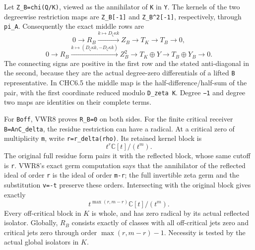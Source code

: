Let \texttt{Z\_B=chi(Q/K)\textquotesingle{}}, viewed as the annihilator
of \texttt{K} in \texttt{Y}. The kernels of the two degreewise
restriction maps are \texttt{Z\_B{[}-1{]}} and
\texttt{Z\_B\^{}2{[}-1{]}}, respectively, through
\texttt{pi\_A\textquotesingle{}}. Consequently the exact middle rows are
\[
0\to R_B\xrightarrow{k\mapsto D_\zeta\kappa k}Z_B
\to T_K\to T_B\to0,
\tag{CHC6.4}
\] \[
0\to R_B\xrightarrow{k\mapsto(D_\zeta\kappa k,-D_\zeta\kappa k)}Z_B^2
\to T_K\oplus Y\to T_B\oplus Y_B\to0.
\tag{CHC6.5}
\] The connecting signs are positive in the first row and the stated
anti-diagonal in the second, because they are the actual degree-zero
differentials of a lifted \texttt{B} representative. In CHC6.5 the
middle map is the half-difference/half-sum of the pair, with the first
coordinate reduced modulo \texttt{D\_zeta\ K}. Degree \texttt{−1} and
degree two maps are identities on their complete terms.

For \texttt{Boff}, VWR8 proves \texttt{R\_B=0} on both sides. For the
finite critical receiver \texttt{B=A∩C\_delta}, the residue restriction
can have a radical. At a critical zero of multiplicity \texttt{m}, write
\texttt{r=r\_delta(rho)}. Its retained kernel block is \[
t^r\mathbb C[t]/(t^m).
\] The original full residue form pairs it with the reflected block,
whose same cutoff is \texttt{r}. VWR8's exact germ computation says that
the annihilator of the reflected ideal of order \texttt{r} is the ideal
of order \texttt{m-r}; the full invertible zeta germ and the
substitution \texttt{v=-t} preserve these orders. Intersecting with the
original block gives exactly \[
t^{\max(r,m-r)}\mathbb C[t]/(t^m).
\tag{CHC6.6}
\] Every off-critical block in \(K\) is whole, and has zero radical by
its actual reflected isolator. Globally, \(R_B\) consists exactly of
classes with all off-critical jets zero and critical jets zero through
order \(\max(r,m-r)-1\). Necessity is tested by the actual global
isolators in \(K\).

